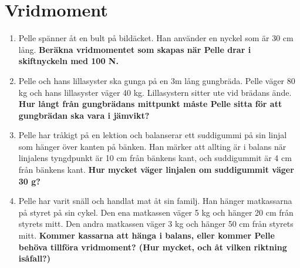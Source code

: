 \documentclass[11pt]{article}
\begin{document}
\raggedright
\setcounter{section}{2}
\section{Vridmoment}

\begin{enumerate}[itemsep=2em]
        \item
              \begin{minipage}[t]{0.5\textwidth}
                      Pelle spänner åt en bult på bildäcket. Han använder en nyckel som är 30 cm lång. \textbf{Beräkna vridmomentet som skapas när Pelle drar i skiftnyckeln med 100 N.}
              \end{minipage}
              \hfill
              \begin{adjustbox}{valign=t}
                      
              \end{adjustbox}
        \item
              Pelle och hans lillasyster ska gunga på en 3m lång gungbräda. Pelle väger 80 kg och hans lillasyster väger 40 kg. Lillasystern sitter ute vid brädans ände. \textbf{Hur långt från gungbrädans mittpunkt måste Pelle sitta för att gungbrädan ska vara i jämvikt?}
              \begin{center}
                      
              \end{center}

        \item
              Pelle har tråkigt på en lektion och balanserar ett suddigummi på sin linjal som hänger över kanten på bänken. Han märker att allting är i balans när linjalens tyngdpunkt är 10 cm från bänkens kant, och suddigummit är 4 cm från bänkens kant. \textbf{Hur mycket väger linjalen om suddigummit väger 30 g?}
              \begin{center}
                      
              \end{center}

        \item
              \begin{minipage}[t]{0.5\textwidth}
                      Pelle har varit snäll och handlat mat åt sin familj. Han hänger matkassarna på styret på sin cykel. Den ena matkassen väger 5 kg och hänger 20 cm från styrets mitt. Den andra matkassen väger 3 kg och hänger 50 cm från styrets mitt. \textbf{Kommer kassarna att hänga i balans, eller kommer Pelle behöva tillföra vridmoment? (Hur mycket, och åt vilken riktning isåfall?)}
              \end{minipage}
              \hspace{1em}
              \begin{adjustbox}{valign=t}
                      
              \end{adjustbox}


\end{enumerate}
\end{document}
